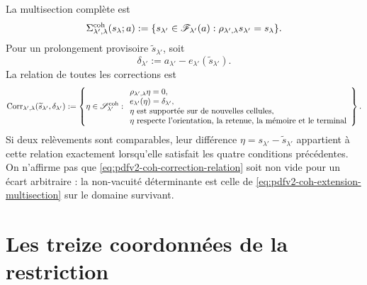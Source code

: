 La multisection complète est
\begin{equation}\label{eq:pdfv2-coh-extension-multisection}
 \Sigma_{\lambda',\lambda}^{\rm coh}(s_\lambda;a)
 :=\{s_{\lambda'}\in\mathscr F_{\lambda'}(a):
 \rho_{\lambda',\lambda}s_{\lambda'}=s_\lambda\}.
\end{equation}
Pour un prolongement provisoire \(\widetilde s_{\lambda'}\), soit
\begin{equation}\label{eq:pdfv2-coh-discrepancy}
 \delta_{\lambda'}:=
 a_{\lambda'}-e_{\lambda'}(\widetilde s_{\lambda'}).
\end{equation}
La relation de toutes les corrections est
\begin{equation}\label{eq:pdfv2-coh-correction-relation}
 \operatorname{Corr}_{\lambda',\lambda}
 (\widetilde s_{\lambda'},\delta_{\lambda'})
 :=\left\{\eta\in\mathscr S_{\lambda'}^{\rm coh}:
 \begin{array}{l}
 \rho_{\lambda',\lambda}\eta=0,\\
 e_{\lambda'}(\eta)=\delta_{\lambda'},\\
 \eta\text{ est supportée sur de nouvelles cellules},\\
 \eta\text{ respecte l’orientation, la retenue, la mémoire et le terminal}
 \end{array}
 \right\}.
\end{equation}
Si deux relèvements sont comparables, leur différence
\(\eta=s_{\lambda'}-\widetilde s_{\lambda'}\) appartient à cette relation
exactement lorsqu'elle satisfait les quatre conditions précédentes. On n'affirme pas
que \eqref{eq:pdfv2-coh-correction-relation} soit non vide pour un
écart arbitraire : la non-vacuité déterminante est celle de
\eqref{eq:pdfv2-coh-extension-multisection} sur le domaine survivant.

\iffalse
\section{Les treize coordonnées de la restriction}
\label{sec:pdfv2-coh-thirteen}

